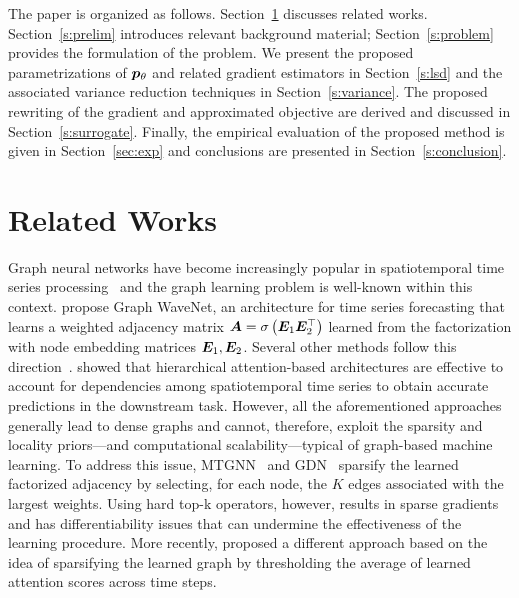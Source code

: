 The paper is organized as follows. Section~\ref{s:related-works} discusses related works. Section~\ref{s:prelim} introduces relevant background material; Section~\ref{s:problem} provides the formulation of the problem. We present the proposed parametrizations of ${{\bm{p}}_\theta}$ and related gradient estimators in Section~\ref{s:lsd} and the associated variance reduction techniques in Section~\ref{s:variance}. The proposed rewriting of the gradient and approximated objective are derived and discussed in Section~\ref{s:surrogate}. Finally, the empirical evaluation of the proposed method is given in Section~\ref{sec:exp} and conclusions are presented in Section~\ref{s:conclusion}.


\section{Related Works}\label{s:related-works}

Graph neural networks have become increasingly popular in spatiotemporal time series processing~\citep{seo2018structured,li2018diffusion, yu2018spatio, wu2019graph, deng2021graph, cini2022filling, marisca2022learning, wu2021traversenet} and the graph learning problem is well-known within this context.
\citet{wu2019graph} propose Graph WaveNet, an architecture for time series forecasting that learns a  weighted adjacency matrix ${\bm{A}}=\sigma\left({\bm{E}}_1{\bm{E}}_2^\top\right)$ learned from the factorization with node embedding matrices ${\bm{E}}_1,{\bm{E}}_2$. Several other methods follow this direction~\citep{bai2020adaptive, oreshkin2020fcgaga}.
\citet{satorras2022multivariate} showed that hierarchical attention-based architectures are effective to account for dependencies among spatiotemporal time series to obtain accurate predictions in the downstream task.
However, all the aforementioned approaches generally lead to dense graphs and cannot, therefore, exploit the sparsity and locality priors---and computational scalability---typical of graph-based machine learning. 
To address this issue, MTGNN~\citep{wu2020connecting} and GDN~\citep{deng2021graph} sparsify the learned factorized adjacency by selecting, for each node, the $K$ edges associated with the largest weights. Using hard top-k operators, however, results in sparse gradients and has differentiability issues that can undermine the effectiveness of the learning procedure. More recently, \citet{zhang2022graph} proposed a different approach based on the idea of sparsifying the learned graph by thresholding the average of learned attention scores across time steps.

